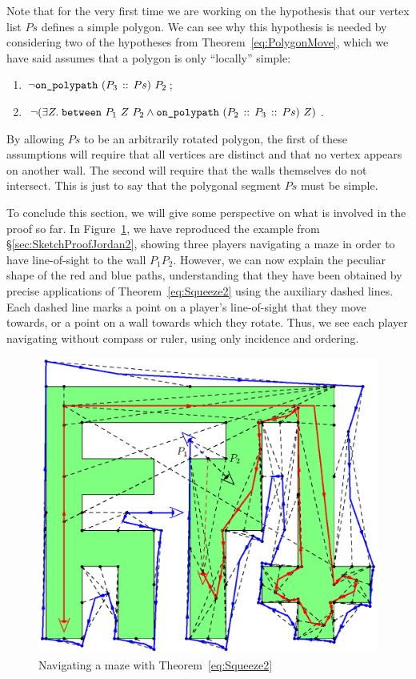 Note that for the very first time we are working on the hypothesis that our vertex list $Ps$ defines a simple polygon. We can see why this hypothesis is needed by considering two of the hypotheses from Theorem~\ref{eq:PolygonMove}, which we have said assumes that a polygon is only ``locally'' simple:
\begin{enumerate}
\item $\neg\code{on\_polypath}\ (\cons{P_3}{Ps})\ P_2$;
\item $\neg(\exists Z.\; \between{P_1}{Z}{P_2} \wedge \code{on\_polypath}\ (\cons{P_2}{\cons{P_3}{Ps}})\ Z)$.
\end{enumerate}

By allowing $Ps$ to be an arbitrarily rotated polygon, the first of these assumptions will require that all vertices are distinct and that no vertex appears on another wall. The second will require that the walls themselves do not intersect. This is just to say that the polygonal segment $Ps$ must be simple.

To conclude this section, we will give some perspective on what is involved in the proof so far. In Figure~\ref{fig:SketchProofJordan2Full}, we have reproduced the example from \S\ref{sec:SketchProofJordan2}, showing three players navigating a maze in order to have line-of-sight to the wall $P_1P_2$. However, we can now explain the peculiar shape of the red and blue paths, understanding that they have been obtained by precise applications of Theorem~\ref{eq:Squeeze2} using the auxiliary dashed lines. Each dashed line marks a point on a player's line-of-sight that they move towards, or a point on a wall towards which they rotate. Thus, we see each player navigating without compass or ruler, using only incidence and ordering.

\begin{figure}
  \centering\includegraphics[scale=0.9]{jordanVerification2/SketchProofFull}
  \caption{Navigating a maze with Theorem~\ref{eq:Squeeze2}}
  \label{fig:SketchProofJordan2Full}
\end{figure}

